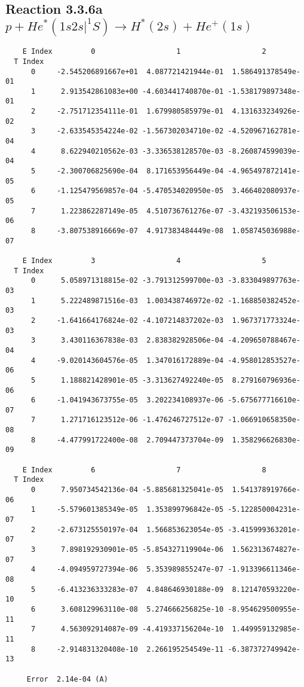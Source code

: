 \documentclass[12pt]{article}
\begin{document}
                               


\newpage
\subsection{
Reaction 3.3.6a $  p + He^*(1s2s|^1S) \rightarrow H^*(2s) + He^+(1s)$}


\begin{small}\begin{verbatim}
    E Index         0                   1                   2
  T Index
      0     -2.545206891667e+01  4.087721421944e-01  1.586491378549e-01
      1      2.913542861083e+00 -4.603441740870e-01 -1.538179897348e-01
      2     -2.751712354111e-01  1.679980585979e-01  4.131633234926e-02
      3     -2.633545354224e-02 -1.567302034710e-02 -4.520967162781e-04
      4      8.622940210562e-03 -3.336538128570e-03 -8.260874599039e-04
      5     -2.300706825690e-04  8.171653956449e-04 -4.965497872141e-05
      6     -1.125479569857e-04 -5.470534020950e-05  3.466402080937e-05
      7      1.223862287149e-05  4.510736761276e-07 -3.432193506153e-06
      8     -3.807538916669e-07  4.917383484449e-08  1.058745036988e-07

    E Index         3                   4                   5
  T Index
      0      5.058971318815e-02 -3.791312599700e-03 -3.833049897763e-03
      1      5.222489871516e-03  1.003438746972e-02 -1.168850382452e-03
      2     -1.641664176824e-02 -4.107214837202e-03  1.967371773324e-03
      3      3.430116367838e-03  2.838382928506e-04 -4.209650788467e-04
      4     -9.020143604576e-05  1.347016172889e-04 -4.958012853527e-06
      5      1.188821428901e-05 -3.313627492240e-05  8.279160796936e-06
      6     -1.041943673755e-05  3.202234108937e-06 -5.675677716610e-07
      7      1.271716123512e-06 -1.476246727512e-07 -1.066910658350e-08
      8     -4.477991722400e-08  2.709447373704e-09  1.358296626830e-09

    E Index         6                   7                   8
  T Index
      0      7.950734542136e-04 -5.885681325041e-05  1.541378919766e-06
      1     -5.579601385349e-05  1.353899796842e-05 -5.122850004231e-07
      2     -2.673125550197e-04  1.566853623054e-05 -3.415999363201e-07
      3      7.898192930901e-05 -5.854327119904e-06  1.562313674827e-07
      4     -4.094959727394e-06  5.353989855247e-07 -1.913396611346e-08
      5     -6.413236333283e-07  4.848646930188e-09  8.121470593220e-10
      6      3.608129963110e-08  5.274666256825e-10 -8.954629500955e-11
      7      4.563092914087e-09 -4.419337156204e-10  1.449959132985e-11
      8     -2.914831320408e-10  2.266195254549e-11 -6.387372749942e-13

     Error  2.14e-04 (A)
\end{verbatim}\end{small}
\end{document}
